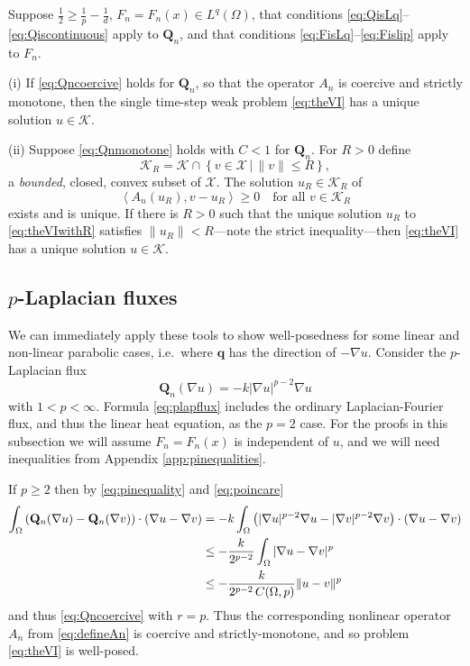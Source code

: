 \documentclass[final,leqno,onefignum,onetabnum]{siamltex1213bueler}
\newcommand\bq{\mathbf{q}}
\newcommand\bQ{\mathbf{Q}}
\renewcommand{\grad}{\nabla}
\newcommand{\ip}[2]{\ensuremath{\left<#1,#2\right>}}
\begin{document}
\medskip
\begin{theorem}  \label{thm:monowellposed}  Suppose $\frac{1}{2} \ge \frac{1}{p} - \frac{1}{d}$, $F_n=F_n(x)\in L^q(\Omega)$, that conditions \eqref{eq:QisLq}--\eqref{eq:Qiscontinuous} apply to $\bQ_n$, and that conditions \eqref{eq:FisLq}--\eqref{eq:Fislip} apply to $F_n$.

(i)  If \eqref{eq:Qncoercive} holds for $\bQ_n$, so that the operator $A_n$ is coercive and strictly monotone, then the single time-step weak problem \eqref{eq:theVI} has a unique solution $u\in\mathcal{K}$.

(ii) Suppose \eqref{eq:Qnmonotone} holds with $C<1$ for $\bQ_n$.  For $R>0$ define
    $$\mathcal{K}_R = \mathcal{K} \cap \left\{v\in \mathcal{X} \,\Big|\, \|v\|\le R\right\},$$
a \emph{bounded}, closed, convex subset of $\mathcal{X}$.  The solution $u_R\in \mathcal{K}_R$ of
\begin{equation}
  \ip{A_n(u_R)}{v-u_R} \ge 0 \quad \text{for all $v \in \mathcal{K}_R$} \label{eq:theVIwithR}
\end{equation}
exists and is unique.  If there is $R>0$ such that the unique solution $u_R$ to \eqref{eq:theVIwithR} satisfies $\|u_R\| < R$---note the strict inequality---then \eqref{eq:theVI} has a unique solution $u\in\mathcal{K}$.
\end{theorem}

\subsection{$p$-Laplacian fluxes} \label{subsec:plap}  We can immediately apply these tools to show well-posedness for some linear and non-linear parabolic cases, i.e.~where $\bq$ has the direction of $-\grad u$.  Consider the $p$-Laplacian \cite{Evans} flux
\begin{equation}
  \bQ_n(\grad u) = - k |\grad u|^{p-2} \grad u \label{eq:plapflux}
\end{equation}
with $1<p<\infty$.  Formula \eqref{eq:plapflux} includes the ordinary Laplacian-Fourier flux, and thus the linear heat equation, as the $p=2$ case.  For the proofs in this subsection we will assume $F_n=F_n(x)$ is independent of $u$, and we will need inequalities from Appendix \ref{app:pinequalities}.

If $p\ge 2$ then by \eqref{eq:pinequality} and \eqref{eq:poincare}
\begin{align}
\int_\Omega \left(\bQ_n(\grad u) - \bQ_n(\grad v)\right)\cdot (\grad u - \grad v) &= -k  \int_\Omega \left(|\grad u|^{p-2} \grad u - |\grad v|^{p-2} \grad v\right)\cdot (\grad u - \grad v) \notag \\
  &\le - \frac{k}{2^{p-2}} \int_\Omega |\grad u - \grad v|^p \notag \\
  &\le - \frac{k}{2^{p-2}\,C(\Omega,p)} \|u-v\|^p \label{eq:plapQnmono}
\end{align}
and thus \eqref{eq:Qncoercive} with $r=p$.  Thus the corresponding nonlinear operator $A_n$ from \eqref{eq:defineAn} is coercive and strictly-monotone, and so problem \eqref{eq:theVI} is well-posed.
\end{document}
